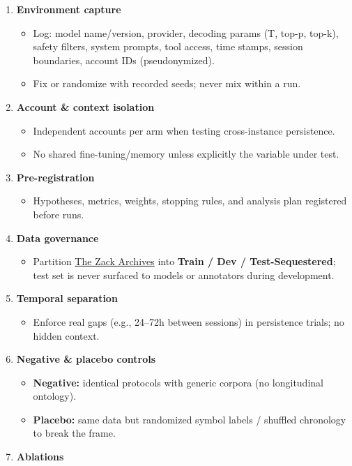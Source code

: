 \documentclass{article}
\begin{document}
\begin{enumerate}
\def\labelenumi{\arabic{enumi}.}
\item
  \textbf{Environment capture}

  \begin{itemize}
  \tightlist
  \item
    Log: model name/version, provider, decoding params (T, top-p, top-k), safety filters, system prompts, tool access, time stamps, session boundaries, account IDs (pseudonymized).
  \item
    Fix or randomize with recorded seeds; never mix within a run.
  \end{itemize}
\item
  \textbf{Account \& context isolation}

  \begin{itemize}
  \tightlist
  \item
    Independent accounts per arm when testing cross-instance persistence.
  \item
    No shared fine-tuning/memory unless explicitly the variable under test.
  \end{itemize}
\item
  \textbf{Pre-registration}

  \begin{itemize}
  \tightlist
  \item
    Hypotheses, metrics, weights, stopping rules, and analysis plan registered before runs.
  \end{itemize}
\item
  \textbf{Data governance}

  \begin{itemize}
  \tightlist
  \item
    Partition \hyperlink{gloss:the_zack_archives}{The Zack Archives} into \textbf{Train / Dev / Test-Sequestered}; test set is never surfaced to models or annotators during development.
  \end{itemize}
\item
  \textbf{Temporal separation}

  \begin{itemize}
  \tightlist
  \item
    Enforce real gaps (e.g., 24--72h between sessions) in persistence trials; no hidden context.
  \end{itemize}
\item
  \textbf{Negative \& placebo controls}

  \begin{itemize}
  \tightlist
  \item
    \textbf{Negative:} identical protocols with generic corpora (no longitudinal ontology).
  \item
    \textbf{Placebo:} same data but randomized symbol labels / shuffled chronology to break the frame.
  \end{itemize}
\item
  \textbf{Ablations}


\end{enumerate}
\end{document}
